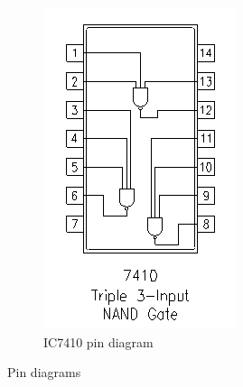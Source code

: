 \documentclass[a4paper,12pt]{article}
\begin{document}
\begin{figure}[H]
\begin{subfigure}[b]{0.45\textwidth}
        \includegraphics[width=\linewidth]{figs/7410.png} %
        \caption{IC7410 pin diagram}
        \label{fig:image2}
    \end{subfigure}
    
    \caption{Pin diagrams}
    \label{fig:side_by_side}
\end{figure}
\end{document}
